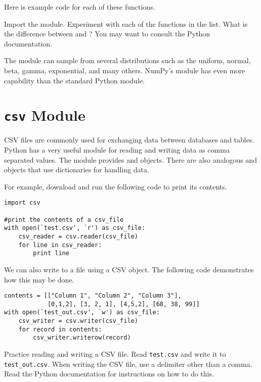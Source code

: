 Here is example code for each of these functions.
\begin{problem}
Import the  module.  Experiment with each of the functions in the list.  What is the difference between  and ?  You may want to consult the Python documentation.
\end{problem}

The  module can sample from several distributions such as the uniform, normal, beta, gamma, exponential, and many others.
NumPy's  module has even more capability than the standard Python  module.

\section*{\texttt{csv} Module}
CSV files are commonly used for exchanging data between databases and tables. 
Python has a very useful module for reading and writing data as comma separated values.
The  module provides  and  objects.
There are also analogous  and  objects that use dictionaries for handling data.

For example, download  and run the following code to print its contents.
\begin{lstlisting}
import csv

#print the contents of a csv_file
with open(`test.csv', `r') as csv_file:
    csv_reader = csv.reader(csv_file)
    for line in csv_reader:
        print line
\end{lstlisting}

We can also write to a  file using a CSV  object.  The following code demonstrates how this may be done.

\begin{lstlisting}
contents = [["Column 1", "Column 2", "Column 3"],
            [0,1,2], [3, 2, 1], [4,5,2], [68, 38, 99]]
with open(`test_out.csv', `w') as csv_file:
    csv_writer = csv.writer(csv_file)
    for record in contents:
        csv_writer.writerow(record)
\end{lstlisting}

\begin{problem}
Practice reading and writing a CSV file.
Read \texttt{test.csv} and write it to \texttt{test\_out.csv}.
When writing the CSV file, use a delimiter other than a comma.
Read the Python documentation for instructions on how to do this.
\end{problem}

